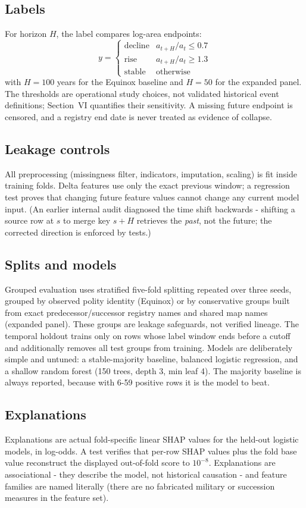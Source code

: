 \documentclass[conference]{IEEEtran}
\begin{document}
\subsection{Labels}
For horizon $H$, the label compares log-area endpoints:
\[
y = \begin{cases}
\text{decline} & a_{t+H}/a_t \le 0.7\\
\text{rise} & a_{t+H}/a_t \ge 1.3\\
\text{stable} & \text{otherwise}
\end{cases}
\]
with $H{=}100$ years for the Equinox baseline and $H{=}50$ for the expanded panel.
The thresholds are operational study choices, not validated historical event
definitions; Section~VI quantifies their sensitivity. A missing future endpoint is
censored, and a registry end date is never treated as evidence of collapse.

\subsection{Leakage controls}
All preprocessing (missingness filter, indicators, imputation, scaling) is fit
inside training folds. Delta features use only the exact previous window; a
regression test proves that changing future feature values cannot change any
current model input. (An earlier internal audit diagnosed the time shift backwards
- shifting a source row at $s$ to merge key $s{+}H$ retrieves the \emph{past}, not
the future; the corrected direction is enforced by tests.)

\subsection{Splits and models}
Grouped evaluation uses stratified five-fold splitting repeated over three seeds,
grouped by observed polity identity (Equinox) or by conservative groups built from
exact predecessor/successor registry names and shared map names (expanded panel).
These groups are leakage safeguards, not verified lineage. The temporal holdout
trains only on rows whose label window ends before a cutoff and additionally
removes all test groups from training. Models are deliberately simple and
untuned: a stable-majority baseline, balanced logistic regression, and a shallow
random forest (150 trees, depth 3, min leaf 4). The majority baseline is always
reported, because with 6-59 positive rows it is the model to beat.

\subsection{Explanations}
Explanations are actual fold-specific linear SHAP values for the held-out logistic
models, in log-odds. A test verifies that per-row SHAP values plus the fold base
value reconstruct the displayed out-of-fold score to $10^{-8}$. Explanations are
associational - they describe the model, not historical causation - and feature
families are named literally (there are no fabricated military or succession
measures in the feature set).
\end{document}
